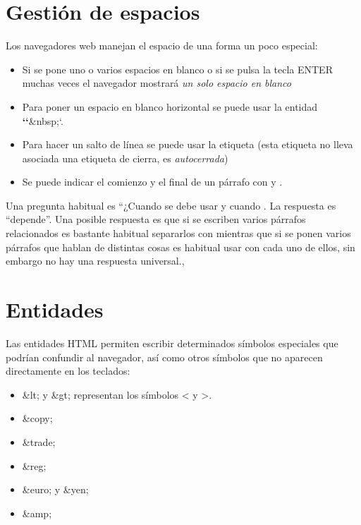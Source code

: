 \documentclass[letterpaper,10pt,spanish]{sphinxmanual}
\begin{document}
\section{Gestión de espacios}
\label{tema2:gestion-de-espacios}
Los navegadores web manejan el espacio de una forma un poco especial:
\begin{itemize}
\item {} 
Si se pone uno o varios espacios en blanco o si se pulsa la tecla ENTER muchas veces el navegador mostrará \emph{un solo espacio en blanco}

\item {} 
Para poner un espacio en blanco horizontal se puede usar la entidad {\color{red}\bfseries{}{}`{}`}\&nbsp;{}`.

\item {} 
Para hacer un salto de línea se puede usar la etiqueta  (esta etiqueta no lleva asociada una etiqueta de cierra, es \emph{autocerrada})

\item {} 
Se puede indicar el comienzo y el final de un párrafo con  y .

\end{itemize}

Una pregunta habitual es ``¿Cuando se debe usar  y cuando . La respuesta es ``depende''. Una posible respuesta es que si se escriben varios párrafos relacionados es bastante habitual separarlos con  mientras que si se ponen varios párrafos que hablan de distintas cosas es habitual usar  con cada uno de ellos, sin embargo no hay una respuesta universal.,


\section{Entidades}
\label{tema2:entidades}
Las entidades HTML permiten escribir determinados símbolos especiales que podrían confundir al navegador, así como otros símbolos que no aparecen directamente en los teclados:
\begin{itemize}
\item {} 
\&lt; y \&gt; representan los símbolos \textless{} y \textgreater{}.

\item {} 
\&copy;

\item {} 
\&trade;

\item {} 
\&reg;

\item {} 
\&euro; y \&yen;

\item {} 
\&amp;

\end{itemize}
\end{document}
